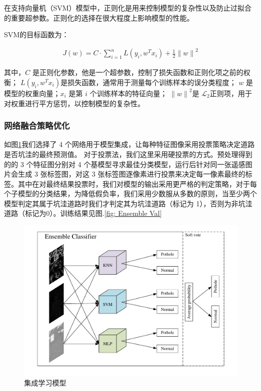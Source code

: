 \documentclass[a4paper, 10pt]{article}
\begin{document}
	在支持向量机（SVM）模型中，正则化是用来控制模型的复杂性以及防止过拟合的重要超参数。正则化的选择在很大程度上影响模型的性能。
	
	SVM的目标函数为：
	
	\begin{equation}
		\begin{aligned}
			J\left( w \right) = C \cdot \sum_{i=1}^{n} L \left(y_i, w^T x_i\right) + \frac{1}{2} {\| w \|}^2
		\end{aligned}
		\label{eq: svm function}
	\end{equation}
	
	其中，$C$ 是正则化参数，他是一个超参数，控制了损失函数和正则化项之前的权衡；
	$L \left(y_i, w^T x_i\right)$是损失函数，通常用于测量每个训练样本的误分类程度；
	$w$ 是模型的权重向量；$x_i$ 是第 $i$ 个训练样本的特征向量；
	${\| w \|}^2$是 $\mathcal{L}_2$正则项，用于对权重进行平方惩罚，以控制模型的复杂性。
	
	\subsubsection{网络融合策略优化}
	
	如图\ref{fig: Ensemble Classifier}我们选择了 4 个网络用于模型集成，让每种特征图像采用投票策略决定道路是否坑洼的最终预测值。
	对于投票法，我们这里采用硬投票的方式。预处理得到的的 3 个特征图分别对 4 个基模型寻求最佳分类模型，运行后针对同一张遥感图片会生成 3 张标签图，对这 3 张标签图逐像素进行投票来决定每一像素最终的标签。其中在对最终结果投票时，我们对模型的输出采用更严格的判定策略，对于每个子模型的分类结果，为降低假负率，我们采用少数服从多数的原则，当至少两个模型判定其属于坑洼道路时我们才判定其为坑洼道路（标记为 1），否则为非坑洼道路（标记为0）。训练结果见图.\ref{fig: Ensemble Val}
	
	\begin{figure}[htb]
		\centering 
		\includegraphics[width=0.6\columnwidth]{picture/Ensemble Classifier}
		\caption{
			\label{fig: Ensemble Classifier} 
			集成学习模型
		}
	\end{figure}
	
\end{document}
